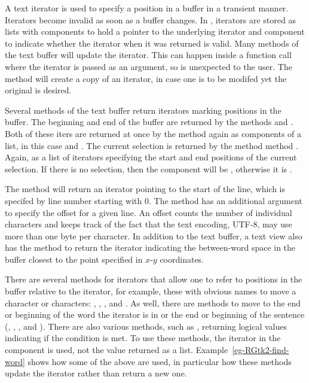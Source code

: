 A text iterator is used to specify a position in a buffer in a transient
manner. Iterators become invalid as soon as a buffer changes.  In
, iterators are stored as lists with components 
to hold a pointer to the underlying iterator and component
 to indicate whether the iterator when it was returned is
valid. Many methods of the text buffer will update the iterator. This
can happen inside a function call where the iterator is passed as an
argument, so is unexpected to the \R\/ user. The
 method will create a copy of an iterator,
in case one is to be modifed yet the original is desired.

Several methods of the text buffer return iterators marking positions in the buffer. 
The beginning and end of the
buffer are returned by the methods
 and
. Both of these iters are
returned at once by the method  again
as components of a list, in this case  and .
The current selection is returned by the method method
. Again, as a list of
iterators specifying the start and end positions of the current
selection. If there is no selection, then the component 
will be , otherwise it is .  

The method  will return an
iterator pointing to the start of the line, which is specifed by line
number starting with 0. The method  has an
additional argument to specify the offset for a given line. An offset
counts the number of individual characters and keeps track of the fact
that the text encoding, UTF-8, may use more than one byte per
character.  In addition to the text buffer, a text view also has the
method  to return the iterator
indicating the between-word space in the buffer closest to the point
specified in $x$-$y$ coordinates.

There are several methods for iterators that allow one to refer to
positions in the buffer relative to the iterator, for example, these
with obvious names to move a character or characters:
, ,
, and
. As well, there are methods to
move to the end or beginning of the word the iterator is in or the end
or beginning of the sentence (,
,
, and
).  There are also various methods,
such as , returning logical values
indicating if the condition is met.
To use these methods, the iterator in the
 component is used, not the value returned as a
list. Example~\ref{eg-RGtk2-find-word} shows how some of the above are
used, in particular how these methods update the iterator rather than
return a new one.

